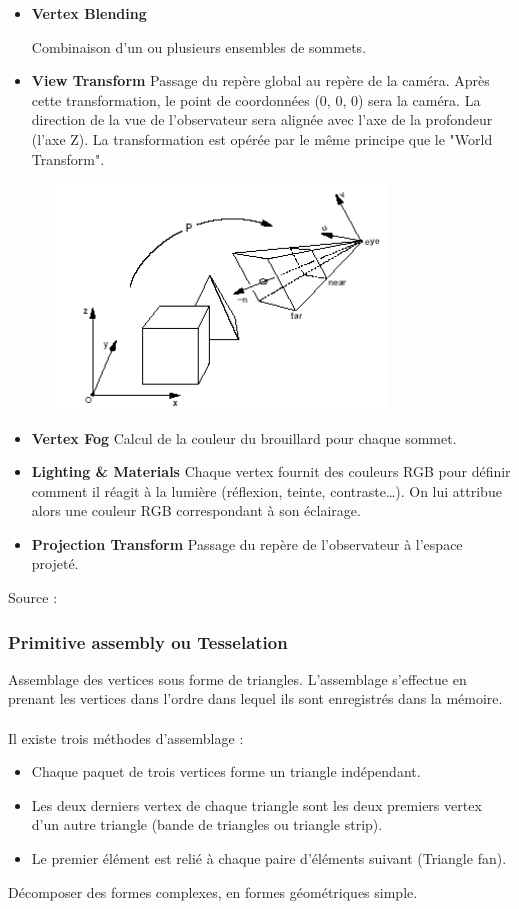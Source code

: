 \begin{itemize}
	\item{\textbf{Vertex Blending}}

Combinaison d’un ou plusieurs ensembles de sommets.
\\
	\item{\textbf{View Transform}}
Passage du repère global au repère de la caméra. Après cette transformation, le point de coordonnées (0, 0, 0) sera la caméra. La direction de la vue de l’observateur sera alignée avec l'axe de la profondeur (l'axe Z). La transformation est opérée par le même principe que le "World Transform".
\\
\begin{center}
\includegraphics[width=10cm,height=60mm]{pipeline/images/repereCamera.png}
\end{center}

	\item{\textbf{Vertex Fog}}
Calcul de la couleur du brouillard pour chaque sommet.
\\
	\item{\textbf{Lighting \& Materials}}
Chaque vertex fournit des couleurs RGB pour définir comment il réagit à la lumière (réflexion, teinte, contraste…). On lui attribue alors une couleur RGB correspondant à son éclairage.
\\
	\item{\textbf{Projection Transform}}
Passage du repère de l'observateur à l'espace projeté.
\\
\end{itemize}

Source : \cite{pipeline3}

\subsubsection{Primitive assembly ou Tesselation}
Assemblage des vertices sous forme de triangles. L’assemblage s’effectue en prenant les vertices dans l’ordre dans lequel ils sont enregistrés dans la mémoire.
\\\\
Il existe trois méthodes d’assemblage :
\begin{itemize}
	\item Chaque paquet de trois vertices forme un triangle indépendant.
	\item Les deux derniers vertex de chaque triangle sont les deux premiers vertex d’un autre triangle (bande de triangles ou triangle strip).
	\item Le premier élément est relié à chaque paire d’éléments suivant (Triangle fan).
	\end{itemize}
Décomposer des formes complexes, en formes géométriques simple.

